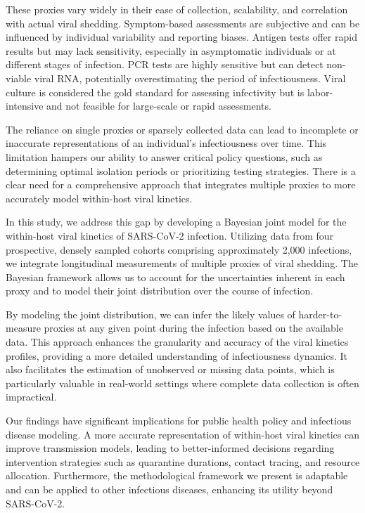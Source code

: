 \documentclass[12pt]{article}
\begin{document}
These proxies vary widely in their ease of collection, scalability, and correlation with actual viral shedding. Symptom-based assessments are subjective and can be influenced by individual variability and reporting biases. Antigen tests offer rapid results but may lack sensitivity, especially in asymptomatic individuals or at different stages of infection. PCR tests are highly sensitive but can detect non-viable viral RNA, potentially overestimating the period of infectiousness. Viral culture is considered the gold standard for assessing infectivity but is labor-intensive and not feasible for large-scale or rapid assessments.

The reliance on single proxies or sparsely collected data can lead to incomplete or inaccurate representations of an individual's infectiousness over time. This limitation hampers our ability to answer critical policy questions, such as determining optimal isolation periods or prioritizing testing strategies. There is a clear need for a comprehensive approach that integrates multiple proxies to more accurately model within-host viral kinetics.

In this study, we address this gap by developing a Bayesian joint model for the within-host viral kinetics of SARS-CoV-2 infection. Utilizing data from four prospective, densely sampled cohorts comprising approximately 2,000 infections, we integrate longitudinal measurements of multiple proxies of viral shedding. The Bayesian framework allows us to account for the uncertainties inherent in each proxy and to model their joint distribution over the course of infection.

By modeling the joint distribution, we can infer the likely values of harder-to-measure proxies at any given point during the infection based on the available data. This approach enhances the granularity and accuracy of the viral kinetics profiles, providing a more detailed understanding of infectiousness dynamics. It also facilitates the estimation of unobserved or missing data points, which is particularly valuable in real-world settings where complete data collection is often impractical.

Our findings have significant implications for public health policy and infectious disease modeling. A more accurate representation of within-host viral kinetics can improve transmission models, leading to better-informed decisions regarding intervention strategies such as quarantine durations, contact tracing, and resource allocation. Furthermore, the methodological framework we present is adaptable and can be applied to other infectious diseases, enhancing its utility beyond SARS-CoV-2.
\end{document}
